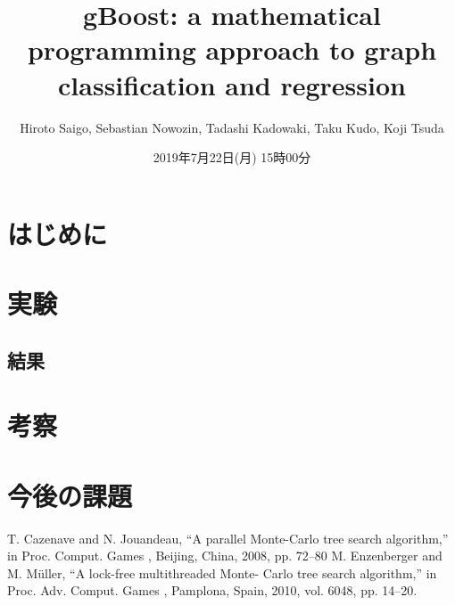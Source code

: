 \documentclass{zasshi-prml3}
\title{gBoost: a mathematical programming approach to graph classification and regression}  %
\date{2019年7月22日(月) 15時00分}      %
\author{Hiroto Saigo, Sebastian Nowozin, Tadashi Kadowaki, Taku Kudo, Koji Tsuda}    %
\begin{document}

\section{はじめに}

\section{実験}

\subsection{結果}

\section{考察}

\section{今後の課題}

\begin{thebibliography}{9}
T. Cazenave and N. Jouandeau, “A
parallel Monte-Carlo tree search
algorithm,” in
Proc. Comput. Games
, Beijing, China, 2008, pp. 72–80
M. Enzenberger and M. Müller, “A
lock-free multithreaded Monte-
Carlo tree search algorithm,” in
Proc. Adv. Comput. Games
, Pamplona,
Spain, 2010, vol. 6048, pp. 14–20.
\end{thebibliography}
\end{document}
